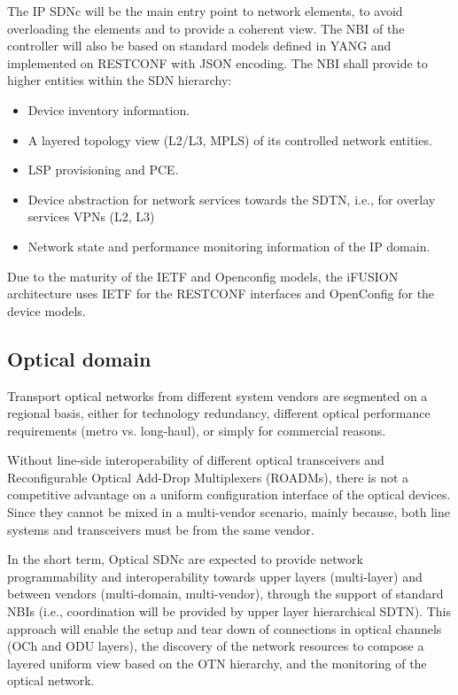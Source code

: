 \documentclass[a4paper,fleqn]{cas-dc}
\begin{document}
The IP SDNc will be the main entry point to network elements, to avoid overloading the elements and to provide a coherent view. The NBI of the controller will also be based on standard models defined in YANG and implemented on RESTCONF with JSON encoding. The NBI shall provide to higher entities within the SDN hierarchy:
\begin{itemize}
\item Device inventory information.
\item A layered topology view (L2/L3, MPLS) of its controlled network entities.
\item LSP provisioning and PCE.
\item Device abstraction for network services towards the SDTN, i.e., for overlay services VPNs (L2, L3)
\item Network state and performance monitoring information of the IP domain. 
\end{itemize}

Due to the maturity of the IETF and Openconfig models, the i\uppercase{FUSION} architecture uses IETF for the RESTCONF interfaces and OpenConfig for the device models.

\subsection{Optical domain}
\label{section:dwdm}
Transport optical networks from different system vendors are segmented on a regional basis, either for technology redundancy, different optical performance requirements (metro vs. long-haul), or simply for commercial reasons. 

Without line-side interoperability of different optical transceivers and Reconfigurable Optical Add-Drop Multiplexers (ROADMs), there is not a competitive advantage on a uniform configuration interface of the optical devices. Since they cannot be mixed in a multi-vendor scenario, mainly because, both line systems and transceivers must be from the same vendor.

In the short term, Optical SDNc are expected to provide network programmability and interoperability towards upper layers (multi-layer) and between vendors (multi-domain, multi-vendor), through the support of standard NBIs (i.e., coordination will be provided by upper layer hierarchical SDTN). This approach will enable the setup and tear down of connections in optical channels (OCh and ODU layers), the discovery of the network resources to compose a layered uniform view based on the OTN hierarchy, and the monitoring of the optical network.
\end{document}
